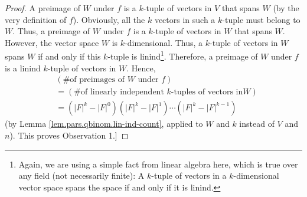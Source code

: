 \begin{proof}
A preimage of $W$ under $f$ is a $k$-tuple of vectors in $V$ that spans $W$
(by the very definition of $f$). Obviously, all the $k$ vectors in such a
$k$-tuple must belong to $W$. Thus, a preimage of $W$ under $f$ is a $k$-tuple
of vectors in $W$ that spans $W$. However, the vector space $W$ is
$k$-dimensional. Thus, a $k$-tuple of vectors in $W$ spans $W$ if and only if
this $k$-tuple is linind\footnote{Again, we are using a simple fact from
linear algebra here, which is true over any field (not necessarily finite): A
$k$-tuple of vectors in a $k$-dimensional vector space spans the space if and
only if it is linind.}. Therefore, a preimage of $W$ under $f$ is a linind
$k$-tuple of vectors in $W$. Hence,%
\begin{align*}
&  \left(  \text{\# of preimages of }W\text{ under }f\right) \\
&  =\left(  \text{\# of linearly independent }k\text{-tuples of vectors in
}W\right) \\
&  =\left(  \left\vert F\right\vert ^{k}-\left\vert F\right\vert ^{0}\right)
\left(  \left\vert F\right\vert ^{k}-\left\vert F\right\vert ^{1}\right)
\cdots\left(  \left\vert F\right\vert ^{k}-\left\vert F\right\vert
^{k-1}\right)
\end{align*}
(by Lemma \ref{lem.pars.qbinom.lin-ind-count}, applied to $W$ and $k$ instead
of $V$ and $n$). This proves Observation 1.]


\end{proof}
